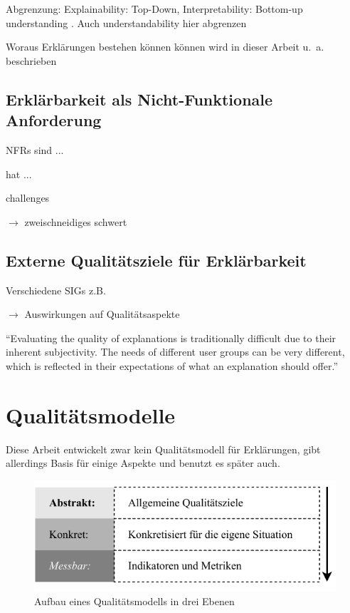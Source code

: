 \smallskip

Abgrenzung: Explainability: Top-Down, Interpretability: Bottom-up understanding \cite{thomson_knowledge--information_2020}. Auch understandability hier abgrenzen

Woraus Erklärungen bestehen können können wird in dieser Arbeit u.~a. beschrieben

\subsection{Erklärbarkeit als Nicht-Funktionale Anforderung}
\label{02_basics:explainability}

NFRs sind ... \cite{chung2009non, schneider2012abenteuer}

\citeauthor{kohl_explainability_2019} hat ...

\citeauthor{chazette2020explainability} challenges

\citeauthor{chazette_end-users_nodate} $\rightarrow$ zweischneidiges schwert

\subsection{Externe Qualitätsziele für Erklärbarkeit}
\label{02_basics:quality_quaracteristic}

Verschiedene SIGs z.B. \cite{do2010software}

\citeauthor{chazette_knowledge_nodate} $\rightarrow$ Auswirkungen auf Qualitätsaspekte

“Evaluating the quality of explanations is traditionally difficult due to their inherent subjectivity. The needs of different user groups can be very different, which is reflected in their expectations of what an explanation should offer.” \cite{martin_developing_2019, martin_evaluating_2021}

\section{Qualitätsmodelle}

Diese Arbeit entwickelt zwar kein Qualitätsmodell für Erklärungen, gibt allerdings Basis für einige Aspekte und benutzt es später auch.

\begin{figure}[htb!]
    \centering
    \includegraphics{contents/02_basics/res/quality_models.pdf}
    \caption{Aufbau eines Qualitätsmodells in drei Ebenen \cite[S. 34, ][]{schneider2012abenteuer}}
    \label{fig:basics_quality_models}
\end{figure}

\cite{schneider2012abenteuer}